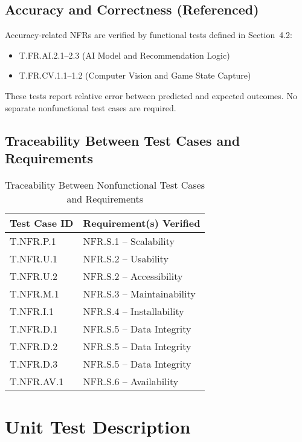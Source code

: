 \documentclass[12pt, titlepage]{article}
\begin{document}
\subsection{Accuracy and Correctness (Referenced)}

Accuracy-related NFRs are verified by functional tests defined in Section~4.2:
\begin{itemize}
    \item T.FR.AI.2.1--2.3 (AI Model and Recommendation Logic)
    \item T.FR.CV.1.1--1.2 (Computer Vision and Game State Capture)
\end{itemize}
These tests report relative error between predicted and expected outcomes. No separate nonfunctional test cases are required.

\subsection{Traceability Between Test Cases and Requirements}

\begin{table}[H]
  \centering
  \caption{Traceability Between Nonfunctional Test Cases and Requirements}
  \label{tab:system-test-traceability}
  \begin{tabular}{|l|l|}
    \hline
    \textbf{Test Case ID} & \textbf{Requirement(s) Verified} \\ \hline
    T.NFR.P.1   & NFR.S.1 -- Scalability \\ \hline
    T.NFR.U.1   & NFR.S.2 -- Usability \\ \hline
    T.NFR.U.2   & NFR.S.2 -- Accessibility \\ \hline
    T.NFR.M.1   & NFR.S.3 -- Maintainability \\ \hline
    T.NFR.I.1   & NFR.S.4 -- Installability \\ \hline
    T.NFR.D.1   & NFR.S.5 -- Data Integrity \\ \hline
    T.NFR.D.2   & NFR.S.5 -- Data Integrity \\ \hline
    T.NFR.D.3   & NFR.S.5 -- Data Integrity \\ \hline
    T.NFR.AV.1  & NFR.S.6 -- Availability \\ \hline
  \end{tabular}
\end{table}


\section{Unit Test Description}
\end{document}
